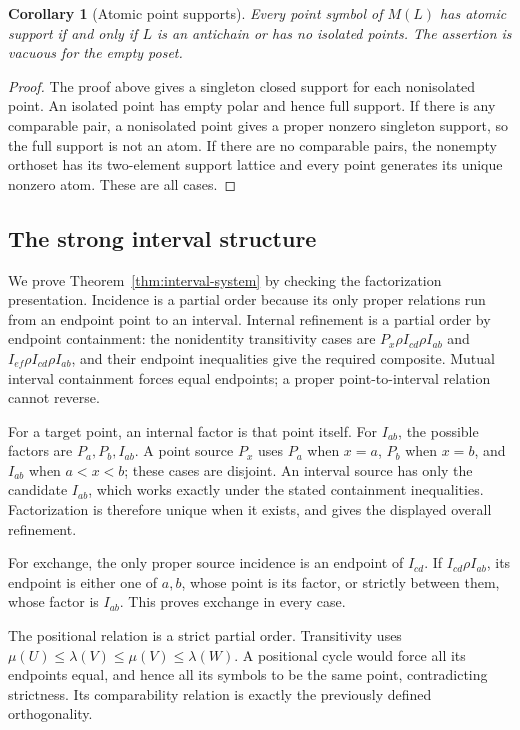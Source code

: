 \documentclass[11pt,a4paper]{article}
\newtheorem{corollary}[theorem]{Corollary}
\theoremstyle{definition}
\begin{document}
\begin{corollary}[Atomic point supports]\label{cor:interval-atoms}
Every point symbol of $M(L)$ has atomic support if and only if
$L$ is an antichain or has no isolated points. The assertion is
vacuous for the empty poset.
\end{corollary}
\begin{proof}
The proof above gives a singleton closed support for each nonisolated
point. An isolated point has empty polar and hence full support.
If there is any comparable pair, a nonisolated point gives a proper
nonzero singleton support, so the full support is not an atom.
If there are no comparable pairs, the nonempty orthoset has its
two-element support lattice and every point generates its unique
nonzero atom. These are all cases.
\end{proof}

\subsection{The strong interval structure}
We prove Theorem~\ref{thm:interval-system} by checking the
factorization presentation. Incidence is a partial order because
its only proper relations run from an endpoint point to an
interval. Internal refinement is a partial order by endpoint
containment: the nonidentity transitivity cases are
$P_x\rho I_{cd}\rho I_{ab}$ and
$I_{ef}\rho I_{cd}\rho I_{ab}$, and their endpoint inequalities
give the required composite. Mutual interval containment forces
equal endpoints; a proper point-to-interval relation cannot reverse.

For a target point, an internal factor is that point itself.
For $I_{ab}$, the possible factors are $P_a,P_b,I_{ab}$.
A point source $P_x$ uses $P_a$ when $x=a$, $P_b$ when $x=b$,
and $I_{ab}$ when $a<x<b$; these cases are disjoint.
An interval source has only the candidate $I_{ab}$, which works
exactly under the stated containment inequalities. Factorization
is therefore unique when it exists, and gives the displayed
overall refinement.

For exchange, the only proper source incidence is an endpoint
of $I_{cd}$. If $I_{cd}\rho I_{ab}$, its endpoint is either
one of $a,b$, whose point is its factor, or strictly between them,
whose factor is $I_{ab}$. This proves exchange in every case.

The positional relation is a strict partial order. Transitivity
uses
$\mu(U)\leq\lambda(V)\leq\mu(V)\leq\lambda(W)$.
A positional cycle would force all its endpoints equal, and
hence all its symbols to be the same point, contradicting
strictness. Its comparability relation is exactly the previously
defined orthogonality.
\end{document}
